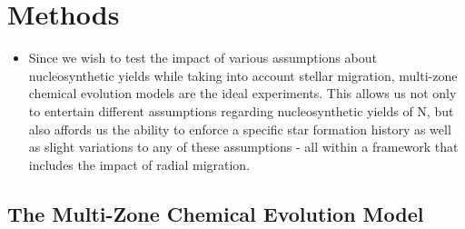 \documentclass[ms.tex]{subfiles}
\begin{document}
 

\section{Methods} 
\label{sec:methods} 

\begin{itemize} 
	\item Since we wish to test the impact of various assumptions about 
	nucleosynthetic yields while taking into account stellar migration, 
	multi-zone chemical evolution models are the ideal experiments. 
	This allows us not only to entertain different assumptions regarding 
	nucleosynthetic yields of N, but also affords us the ability to enforce a 
	specific star formation history as well as slight variations to any of 
	these assumptions - all within a framework that includes the impact of 
	radial migration. 
\end{itemize} 

\subsection{The Multi-Zone Chemical Evolution Model} 
\label{sec:methods:multizone} 
\end{document}
